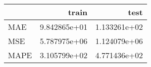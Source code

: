 \begin{tabular}{lrr}
\toprule
{} &         train &          test \\
\midrule
MAE  &  9.842865e+01 &  1.133261e+02 \\
MSE  &  5.787975e+06 &  1.124079e+06 \\
MAPE &  3.105799e+02 &  4.771436e+02 \\
\bottomrule
\end{tabular}
